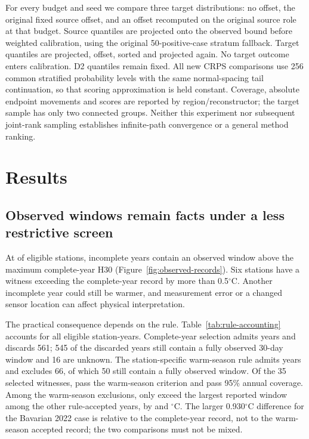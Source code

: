 \documentclass[draft,linenumbers]{agujournal2025}
\begin{document}
For every budget and seed we compare three target distributions: no offset, the original fixed source offset, and an offset recomputed on the original source role at that budget. Source quantiles are projected onto the observed bound before weighted calibration, using the original 50-positive-case stratum fallback. Target quantiles are projected, offset, sorted and projected again. No target outcome enters calibration. D2 quantiles remain fixed. All new CRPS comparisons use 256 common stratified probability levels with the same normal-spacing tail continuation, so that scoring approximation is held constant. Coverage, absolute endpoint movements and scores are reported by region/reconstructor; the target sample has only two connected groups. Neither this experiment nor subsequent joint-rank sampling establishes infinite-path convergence or a general method ranking.

\section{Results}
\subsection{Observed windows remain facts under a less restrictive screen}

At \RRecordStations{} of \RRecordDenominator{} eligible stations, \RRecordStationYears{} incomplete years contain an observed window above the maximum complete-year H30 (Figure~\ref{fig:observed-records}). Six stations have a witness exceeding the complete-year record by more than 0.5$^{\circ}$C. Another incomplete year could still be warmer, and measurement error or a changed sensor location can affect physical interpretation.

The practical consequence depends on the rule. Table~\ref{tab:rule-accounting} accounts for all \CCEligibleYears{} eligible station-years. Complete-year selection admits \CCCompleteAdmitted{} years and discards 561; 545 of the discarded years still contain a fully observed 30-day window and 16 are unknown. The station-specific warm-season rule admits \CCWarmAdmittedYears{} years and excludes 66, of which 50 still contain a fully observed window. Of the 35 selected witnesses, \CCWarmWitnessAdmitted{} pass the warm-season criterion and \CCAnnualWitnessAdmitted{} pass 95\% annual coverage. Among the warm-season exclusions, only \CCWarmExcludedFacts{} exceed the largest reported window among the other rule-accepted years, by \CCWarmIncrementOne{} and \CCWarmIncrementTwo{} $^{\circ}$C. The larger 0.930$^{\circ}$C difference for the Bavarian 2022 case is relative to the complete-year record, not to the warm-season accepted record; the two comparisons must not be mixed.
\end{document}

